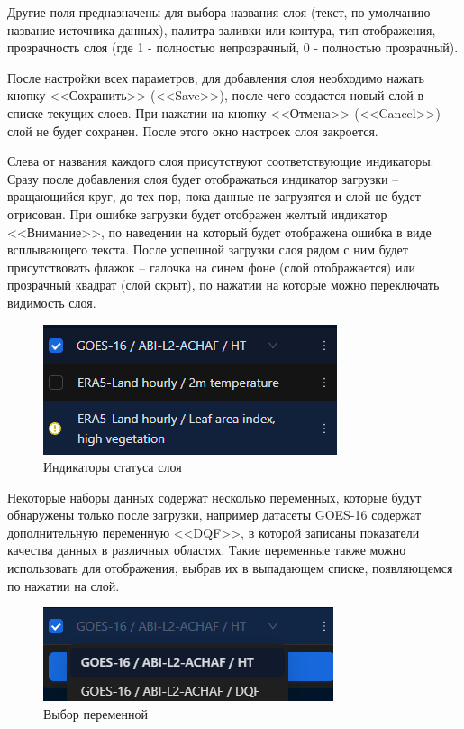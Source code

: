 \documentclass[a4paper, 12pt]{article}
\begin{document}
	Другие поля предназначены для выбора названия слоя (текст, по умолчанию - название источника данных), палитра заливки или
	контура, тип отображения, прозрачность слоя (где 1 - полностью непрозрачный, 0 - полностью прозрачный).

	После настройки всех параметров, для добавления слоя необходимо нажать кнопку <<Сохранить>> (<<Save>>), после чего
	создастся новый слой в списке текущих слоев. При нажатии на кнопку <<Отмена>> (<<Cancel>>) слой не будет сохранен.
	После этого окно настроек слоя закроется.

	Слева от названия каждого слоя присутствуют соответствующие индикаторы. Сразу после добавления слоя будет отображаться
	индикатор загрузки -- вращающийся круг, до тех пор, пока данные не загрузятся и слой не будет отрисован. При ошибке загрузки
	будет отображен желтый индикатор <<Внимание>>, по наведении на который будет отображена ошибка в виде всплывающего
	текста. После успешной загрузки слоя рядом с ним будет присутствовать флажок -- галочка на синем фоне (слой отображается)
	или прозрачный квадрат (слой скрыт), по нажатии на которые можно переключать видимость слоя.

	\begin{figure}[h!]
		\centering
		\includegraphics{./assets/pic5.png}
		\caption{Индикаторы статуса слоя}
	\end{figure}

	Некоторые наборы данных содержат несколько переменных, которые будут обнаружены только после загрузки, например
	датасеты GOES-16 содержат дополнительную переменную <<DQF>>, в которой записаны показатели качества данных в различных
	областях. Такие переменные также можно использовать для отображения, выбрав их в выпадающем списке, появляющемся по
	нажатии на слой.

	\begin{figure}[h!]
		\centering
		\includegraphics{./assets/pic4.png}
		\caption{Выбор переменной}
	\end{figure}
\end{document}
